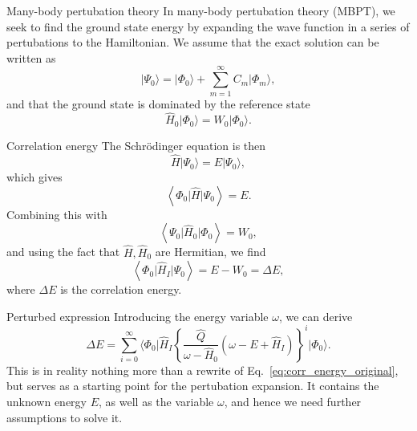 \documentclass[UKenglish,aspectratio=169]{beamer}
\begin{document}
\begin{frame}{Many-body pertubation theory}
    In many-body pertubation theory (MBPT), we seek to find the
    ground state energy by expanding the wave function in a series of
    pertubations to the Hamiltonian.
    We assume that the exact solution can be written as
    \begin{equation}
        \lvert \Psi_0 \rangle
        = \lvert \Phi_0 \rangle + \sum_{m = 1}^\infty C_m \lvert \Phi_m \rangle,
    \end{equation}
    and that the ground state is dominated by the reference state
    \begin{equation}
        \hat{H}_0 \lvert \Phi_0 \rangle = W_0 \lvert \Phi_0 \rangle.
    \end{equation}
\end{frame}

\begin{frame}{Correlation energy}
    The Schrödinger equation is then
    \begin{equation}
        \hat{H} \lvert \Psi_0 \rangle = E \lvert \Psi_0 \rangle,
    \end{equation}
    which gives
    \begin{equation}
        \left\langle \Phi_0 \vert \hat{H} \vert \Psi_0 \right\rangle = E.
    \end{equation}
    Combining this with
    \begin{equation}
        \left\langle \Psi_0 \vert \hat{H}_0 \vert \Phi_0 \right\rangle = W_0,
    \end{equation}
    and using the fact that $\hat{H}, \hat{H}_0$ are Hermitian, we find
    \begin{equation}\label{eq:corr_energy_original}
        \left\langle \Phi_0 \vert \hat{H}_I \vert \Psi_0 \right\rangle
        = E - W_0
        = \Delta E,
    \end{equation}
    where $\Delta E$ is the correlation energy.
\end{frame}

\begin{frame}{Perturbed expression}
    Introducing the energy variable $\omega$, we can derive
    \begin{equation}\label{eq:corr_energy}
        \Delta E = \sum_{i = 0}^\infty \Big\langle \Phi_0 \big\vert \hat{H}_I \left\{
            \frac{\hat{Q}}{\omega - \hat{H}_0} \left( \omega - E + \hat{H}_I \right)
        \right\}^{i} \big\lvert \Phi_0 \Big\rangle.
    \end{equation}
    This is in reality nothing more than a rewrite of Eq.~\eqref{eq:corr_energy_original}, but serves as a starting point for the pertubation expansion.
    It contains the unknown energy $E$, as well as the variable $\omega$, and hence we need further assumptions to solve it.
\end{frame}
\end{document}
